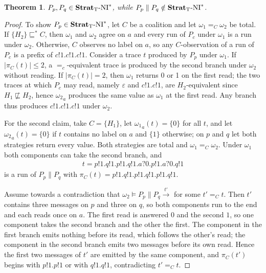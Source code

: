 \documentclass[preprint,5p,twocolumn]{elsarticle}
\newtheorem{theorem}{Theorem}
\begin{document}
\begin{theorem}
  \label{thm:presence needed}
  $P_p, P_q \in \mathbf{Strat}_{\mathrm{T}}\text{-}\mathrm{NI}^*$, while $P_p \parallel P_q \notin \mathbf{Strat}_{\mathrm{T}}\text{-}\mathrm{NI}^*$.
\end{theorem}
\begin{proof}
  To show $P_p \in \mathbf{Strat}_{\mathrm{T}}\text{-}\mathrm{NI}^*$, let $C$ be a coalition and let $\omega_1 =_C \omega_2$ be total. If
  $\lbrace H_2 \rbrace \sqsubseteq^* C$, then $\omega_1$ and $\omega_2$ agree on $a$ and every run of
  $P_c$ under $\omega_1$ is a run under $\omega_2$. Otherwise, $C$ observes no label on $a$, so any
  $C$-observation of a run of $P_c$ is a prefix of $c!1.c!1.c!1$.
  Consider a trace $t$ produced by $P_p$ under $\omega_1$.
  If $|\pi_C(t)| \leq 2$, a $=_c$-equivalent trace is produced by the second branch
  under $\omega_2$ without reading.
  If $|\pi_C(t)|=2$, then $\omega_1$ returns 0 or 1 on the first read;
  the two traces at which $P_c$ may read, namely $\varepsilon$ and $c!1.c!1$,
  are $H_2$-equivalent since $H_1 \not\sqsubseteq H_2$, hence ${\omega_2}_a$
  produces the same value as $\omega_1$ at the first read.
  Any branch thus produces $c!1.c!1.c!1$ under $\omega_2$.

  For the second claim, take $C = \lbrace H_1 \rbrace$, let ${\omega_1}_a(t) = \lbrace 0 \rbrace$ for
  all $t$, and let ${\omega_2}_a(t) = \lbrace 0 \rbrace$ if $t$ contains no label on $a$ and
  $\lbrace 1 \rbrace$ otherwise; on $p$ and $q$ let both strategies return every value.
  Both strategies are
  total and $\omega_1 =_C \omega_2$. Under $\omega_1$ both components can take the second branch, and
  \begin{align*}
    t = p!1.q!1.p!1.q!1.a?0.p!1.a?0.q!1
  \end{align*}
  is a run of $P_p \parallel P_q$ with $\pi_C(t) = p!1.q!1.p!1.q!1.p!1.q!1$.

  Assume towards a contradiction that $\omega_2 \vDash P_p \parallel P_q \xrightarrow{t'}$ for some
  $t' =_C t$. Then $t'$ contains three messages on $p$ and three on $q$, so both components run to
  the end and each reads once on $a$. The first read is answered $0$ and the second
  $1$, so one component takes the second branch and the other the first. The component in the first
  branch emits nothing before its read, which follows the other's read; the component in the second
  branch emits two messages before its own read. Hence the first two messages of $t'$ are emitted
  by the same component, and $\pi_C(t')$ begins with $p!1.p!1$ or with $q!1.q!1$, contradicting
  $t' =_C t$.
\end{proof}
\end{document}
